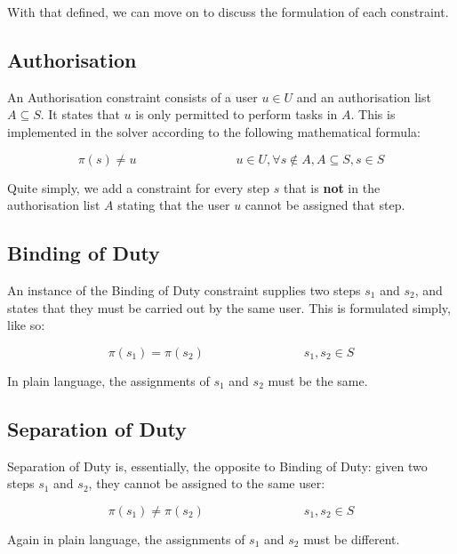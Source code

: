 \documentclass[11pt]{article}
\begin{document}
		With that defined, we can move on to discuss the formulation of each constraint.

		\subsection{Authorisation}

			An Authorisation constraint consists of a user \(u \in U\) and an authorisation list \(A \subseteq S\).
			It states that \(u\) is only permitted to perform tasks in \(A\).
			This is implemented in the solver according to the following mathematical formula:

			\begin{equation}
				\pi(s) \neq u \qquad \qquad \qquad \qquad u \in U, \forall s \notin A, A \subseteq S, s \in S
			\end{equation}

			Quite simply, we add a constraint for every step \(s\) that is \textbf{not} in the authorisation list \(A\)
			stating that the user \(u\) cannot be assigned that step.

		\subsection{Binding of Duty}

			An instance of the Binding of Duty constraint supplies two steps \(s_1\) and \(s_2\),
			and states that they must be carried out by the same user.
			This is formulated simply, like so:

			\begin{equation}
				\pi(s_1) = \pi(s_2) \qquad \qquad \qquad \qquad s_1, s_2 \in S
			\end{equation}

			In plain language, the assignments of \(s_1\) and \(s_2\) must be the same.

		\subsection{Separation of Duty}

			Separation of Duty is, essentially, the opposite to Binding of Duty:
			given two steps \(s_1\) and \(s_2\),
			they cannot be assigned to the same user:

			\begin{equation}
				\pi(s_1) \neq \pi(s_2) \qquad \qquad \qquad \qquad s_1, s_2 \in S
			\end{equation}

			Again in plain language, the assignments of \(s_1\) and \(s_2\) must be different.
\end{document}
